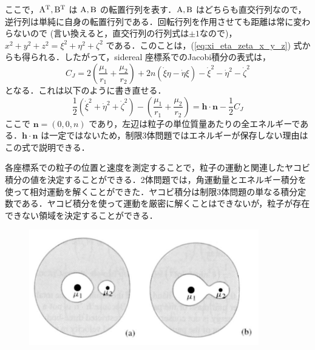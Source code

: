 \documentclass[11pt,a4paper,oneside,onecolumn]{jreport}
\begin{document}
ここで，${\rm A}^{\rm T}, {\rm B}^{\rm T}$ は ${\rm A}, {\rm B}$ の転置行列を表す．${\rm A}, {\rm B}$ はどちらも直交行列なので，逆行列は単純に自身の転置行列である．回転行列を作用させても距離は常に変わらないので (言い換えると，直交行列の行列式は$\pm 1$なので)，$x^2 + y^2 + z^2 = \xi^2 + \eta^2 + \zeta^2$ である．このことは，(\ref{eq:xi_eta_zeta_x_y_z}) 式からも得られる．したがって，sidereal 座標系でのJacobi積分の表式は，
\begin{equation}
C_J = 2 \left( \frac{\mu_1}{r_1} + \frac{\mu_2}{r_2} \right) + 2 n (\dot{\xi} \eta - \dot{\eta} \xi) - \dot{\xi}^2 - \dot{\eta}^2 - \dot{\zeta}^2 \label{eq:C_J}
\end{equation}
となる．これは以下のように書き直せる．
\begin{equation}
 \frac{1}{2} (\dot{\xi}^2 + \dot{\eta}^2 + \dot{\zeta}^2) - \left( \frac{\mu_1}{r_1} + \frac{\mu_2}{r_2} \right) = {\bm h} \cdot {\bm n} - \frac{1}{2} C_J
\end{equation}
ここで ${\bm n} = (0, 0, n)$ であり，左辺は粒子の単位質量あたりの全エネルギーである．${\bm h} \cdot {\bm n}$ は一定ではないため，制限3体問題ではエネルギーが保存しない理由はこの式で説明できる．

各座標系での粒子の位置と速度を測定することで，粒子の運動と関連したヤコビ積分の値を決定することができる．2体問題では，角運動量とエネルギー積分を使って相対運動を解くことができた．ヤコビ積分は制限3体問題の単なる積分定数である．ヤコビ積分を使って運動を厳密に解くことはできないが，粒子が存在できない領域を決定することができる．

\begin{figure}[H]
\centering
\includegraphics[width=10cm]{./image/sec3_2.pdf}
\caption{\label{fig:zerovelo}}
\end{figure}
\end{document}
